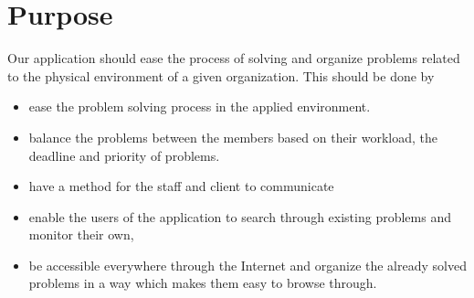\section{Purpose}
Our application should ease the process of solving and organize problems related to the physical environment of a given organization. This should be done by
\begin{itemize}
\item ease the problem solving process in the applied environment. 
\item balance the problems between the \astaff[] members based on their workload, the deadline and priority of problems.
\item have a method for the staff and client to communicate
\item enable the users of the application to search through existing problems and monitor their own, 
\item be accessible everywhere through the Internet and organize the already solved problems in a way which makes them easy to browse through.
\end{itemize}